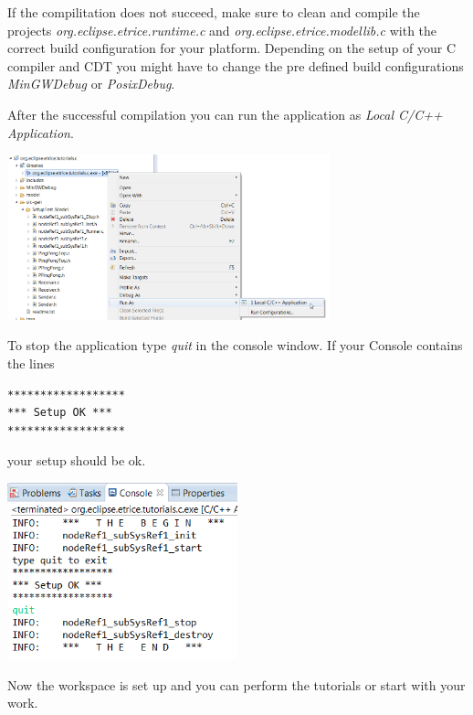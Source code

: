 If the compilitation does not succeed, make sure to clean and compile the projects \emph{org.eclipse.etrice.runtime.c} and \emph{org.eclipse.etrice.modellib.c} with the correct build configuration for your platform. Depending on the setup of your C compiler and CDT you might have to change the pre defined build configurations \emph{MinGWDebug} or \emph{PosixDebug}.

After the successful compilation you can run the application as \emph{Local C/C++ Application}.

\includegraphics[width=0.7\textwidth]{images/014-08-RunAsC-CPP-Application.png}

\newpage
To stop the application type \emph{quit} in the console window. If your Console contains the lines
\begin{verbatim}
******************
*** Setup OK ***
******************
\end{verbatim}
your setup should be ok.

\includegraphics[width=0.5\textwidth]{images/014-09-ConsoleWithSetupOk.png} 

Now the workspace is set up and you can perform the tutorials or start with your work.

